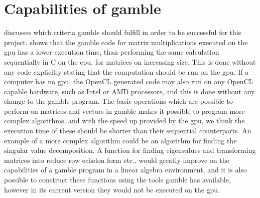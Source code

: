 \section{Capabilities of \gls{gamble}}
 discusses which criteria \gls{gamble} should fulfill in order to be successful for this project.
 shows that the \gls{gamble} code for matrix multiplications executed on the \acrshort{gpu} has a lower execution time, than performing the same calculation sequentially in C on the \acrshort{cpu}, for matrices on increasing size.
This is done without any code explicitly stating that the computation should be run on the \acrshort{gpu}.
If a computer has no \acrshort{gpu}, the OpenCL generated code may also run on any OpenCL capable hardware, such as Intel or AMD processors, and this is done without any change to the \gls{gamble} program.
The basic operations which are possible to perform on matrices and vectors in \gls{gamble} makes it possible to program more complex algorithms, and with the speed up provided by the \acrshort{gpu}, we think the execution time of these should be shorter than their sequential counterparts.
An example of a more complex algorithm could be an algorithm for finding the singular value decomposition.
A function for finding eigenvalues and transforming matrices into reduce row echelon form etc., would greatly improve on the capabilities of a \gls{gamble} program in a linear algebra environment, and it is also possible to construct these functions using the tools \gls{gamble} has available, however in its current version they would not be executed on the \acrshort{gpu}.